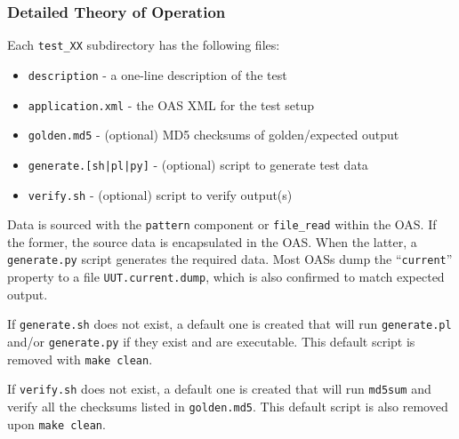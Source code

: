 \documentclass{article}
\begin{document}
\subsubsection*{Detailed Theory of Operation}
\begin{flushleft}
  Each \verb+test_XX+ subdirectory has the following files:

  \begin{itemize}{}{}
    \item \texttt{description} - a one-line description of the test
    \item \texttt{application.xml} - the OAS XML for the test setup
    \item \texttt{golden.md5} - (optional) MD5 checksums of golden/expected output
    \item \texttt{generate.[sh|pl|py]} - (optional) script to generate test data
    \item \texttt{verify.sh} - (optional) script to verify output(s)
  \end{itemize}

	Data is sourced with the \verb+pattern+ component or \verb+file_read+ within the OAS. If the former, the source data is encapsulated in the OAS. When the latter, a \verb+generate.py+ script generates the required data. Most OASs dump the ``\texttt{current}'' property to a file \verb+UUT.current.dump+, which is also confirmed to match expected output.
  \medskip

  If \texttt{generate.sh} does not exist, a default one is created that will run \texttt{generate.pl} and/or \texttt{generate.py} if they exist and are executable. This default script is removed with \verb+make clean+.
  \medskip

	If \texttt{verify.sh} does not exist, a default one is created that will run \texttt{md5sum} and verify all the checksums listed in \texttt{golden.md5}. This default script is also removed upon \verb+make clean+.
  \medskip
\end{flushleft}
\end{document}
